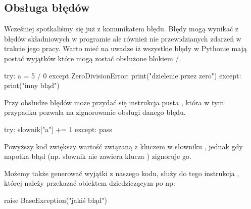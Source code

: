 % 
% 
% 
% 

\subsection{Obsługa błędów}
Wcześniej spotkaliśmy się już z komunikatem błędu. Błędy mogą wynikać z błędów składniowych w programie ale również nie przewidzianych zdarzeń w trakcie jego pracy.
Warto mieć na uwadze iż wszystkie błędy w Pythonie mają postać wyjątków które mogą zostać obsłużone blokiem /.

\begin{CodeFrame*}[python]{}
try:
  a = 5 / 0
except ZeroDivisionError:
  print("dzielenie przez zero")
except:
  print("inny błąd")
\end{CodeFrame*}

Przy obsłudze błędów może przydać się instrukcja pusta , która w tym przypadku pozwala na zignorowanie obsługi danego błędu.

\begin{CodeFrame*}[python]{}
try:
  slownik["a"] += 1
except:
  pass
\end{CodeFrame*}

Powyższy kod zwiększy wartość związaną z kluczem  w słowniku , jednak gdy napotka błąd (np. słownik nie zawiera klucza ) zignoruje go.

Możemy także generować wyjątki z naszego kodu, służy do tego instrukcja , której należy przekazać obiektem dziedziczącym po  np:

\begin{CodeFrame*}[python]{}
raise BaseException("jakiś błąd")
\end{CodeFrame*}
